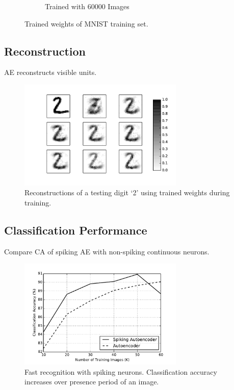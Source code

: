 \begin{figure}
\begin{subfigure}[t]{0.9\textwidth}
			\caption{Trained with 60000 Images}
		\end{subfigure}	
		\caption{Trained weights of MNIST training set.}
	\end{figure}
	
	\subsection{Reconstruction}
	AE reconstructs visible units.
	\begin{figure}
		\centering
		\includegraphics[width=0.7\textwidth]{pics_ae/recon_digit.pdf}
		\caption{Reconstructions of a testing digit `2' using trained weights during training.}
		\label{fig:recon}		
	\end{figure}
	\subsection{Classification Performance}
	Compare CA of spiking AE with non-spiking continuous neurons. 
	\begin{figure}
		\centering
		\includegraphics[width=0.7\textwidth]{pics_ae/recog_comp.pdf}
		\caption{Fast recognition with spiking neurons. Classification accuracy increases over presence period of an image.}
		\label{fig:recog_comp}		
	\end{figure}
	
